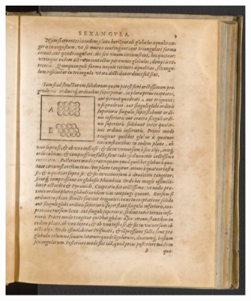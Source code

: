 \begin{figure}
    \vspace{-2em}
    \centering
    \begin{subfigure}{\linewidth}
        \centering
        \includegraphics[width=\linewidth]{Chapters/1_Intro/Images/Kepler_1.pdf}
        \caption{}
        \label{Ch1:Subfig:Kepler_Original_1}
    \end{subfigure}
    \begin{subfigure}{\linewidth}
        \centering

\end{subfigure}
\end{figure}
